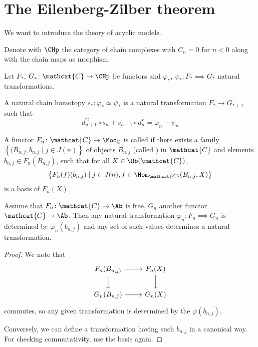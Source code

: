 \section{The Eilenberg-Zilber theorem}

We want to introduce the theory of acyclic models.

\begin{notation}
  Denote with $\CHp$ the category of chain complexes with $C_n = 0$ for  $n<0$
  along with the chain maps as morphism.
\end{notation}

Let $F_*$, $G_*\colon \mathcat{C} \to  \CHp$ be functors
and $\varphi _*$, $\psi _*\colon  F_* \implies G_*$ natural transformations.

\begin{definition}
  A natural chain homotopy $s_* \colon  \varphi _* \simeq \psi _*$
  is a natural transformation $F_* \to  G_{* + 1}$
  such that
  \[
  d_{n+1}^G \circ  s_n + s_{n-1} \circ  d_n^F = \varphi _n - \psi _n
  \] 
\end{definition}

\begin{definition}
  A functor $F_n\colon \mathcat{C} \to \Mod_{\mathbb{Z}}$
  is called  if there exists a family
  $\left\{(B_{n,j}, b_{n,j} \mid  j\in J(n) \right\} $ 
  of objects $B_{n,j}$ (called ) in $\mathcat{C}$
  and elements $b_{n,j} \in F_n(B_{n,j})$,
  such that for all $X\in \Ob(\mathcat{C})$,
  \[
  \left\{F_n(f) (b_{n,j}) \mid  j\in J(n), f\in \Hom_{\mathcat{C}}(B_{n,j},X) \right\} 
  \]
  is a basis of $F_n(X)$.
\end{definition}

\begin{remark}
  Assume that $F_n\colon \mathcat{C} \to  \Ab$ is free,
  $G_n$ another functor  $\mathcat{C} \to  \Ab$.
  Then any natural transformation $\varphi _n \colon F_n \implies G_n$
  is determined by $\varphi _n(b_{n,j})$
  and any set of such values determines a natural transformation.
\end{remark}

\begin{proof}
  We note that
  \[
  \begin{tikzcd}
    F_n(B_{n,j)} \ar[swap]{d}{} \ar{r}{} & F_n(X) \ar{d}{} \\
   G_n(B_{n,j})  \ar[swap]{r}{} & G_n(X)
  \end{tikzcd}
  \]
  commutes, so any given transformation is determined by the $\varphi (b_{n,j})$.

  Conversely, we can define a transformation having such $b_{n,j}$
  in a canonical way.
  For checking commutativity, use the basis again.
\end{proof}

